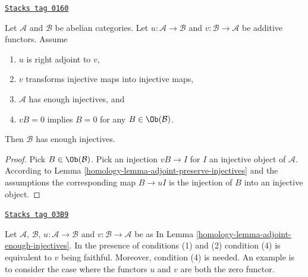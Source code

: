 \begin{lemma}
\label{homology-lemma-adjoint-enough-injectives}
\href{https://stacks.math.columbia.edu/tag/0160}{\texttt{Stacks tag 0160}}

Let $\mathcal{A}$ and $\mathcal{B}$ be abelian categories.
Let $u : \mathcal{A} \to \mathcal{B}$ and
$v : \mathcal{B} \to \mathcal{A}$ be additive functors.
Assume
\begin{enumerate}
\item $u$ is right adjoint to $v$,
\item $v$ transforms injective maps into injective maps,
\item $\mathcal{A}$ has enough injectives, and
\item $vB = 0$ implies $B = 0$ for any $B \in \Ob(\mathcal{B})$.
\end{enumerate}
Then $\mathcal{B}$ has enough injectives.
\end{lemma}

\begin{proof}

Pick $B \in \Ob(\mathcal{B})$.
Pick an injection $vB \to I$ for $I$
an injective object of $\mathcal{A}$.
According to Lemma \ref{homology-lemma-adjoint-preserve-injectives}
and the assumptions the corresponding map
$B \to uI$ is the injection of $B$ into an injective object.
\end{proof}

\begin{remark}
\label{homology-remark-faithfulness-needed}
\href{https://stacks.math.columbia.edu/tag/03B9}{\texttt{Stacks tag 03B9}}

Let $\mathcal{A}$, $\mathcal{B}$, $u : \mathcal{A} \to \mathcal{B}$ and
$v : \mathcal{B} \to \mathcal{A}$ be as
In Lemma \ref{homology-lemma-adjoint-enough-injectives}.
In the presence of conditions (1) and (2) condition (4) is equivalent
to $v$ being faithful. Moreover, condition (4) is needed.
An example is to consider the
case where the functors $u$ and $v$ are both the zero functor.
\end{remark}

